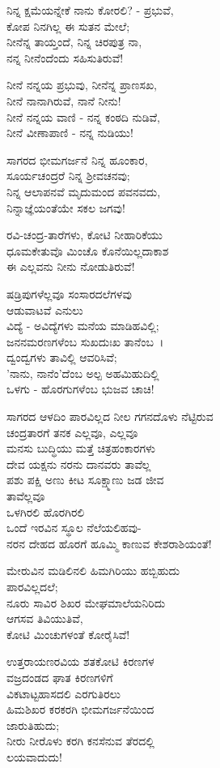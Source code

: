 ನಿನ್ನ ಕ್ಷಮೆಯನ್ನೇಕೆ ನಾನು ಕೋರಲಿ? - ಪ್ರಭುವೆ,\\ಕೋಪ ನಿನಗಿಲ್ಲ ಈ ಸುತನ ಮೇಲೆ;\\ನೀನೆನ್ನ ತಾಯ್ತಂದೆ, ನಿನ್ನ ಚಿರಪುತ್ರ ನಾ,\\ನನ್ನ ನೀನೆಂದೆಂದು ಸಹಿಸುತಿರುವೆ!

ನೀನೆ ನನ್ನಯ ಪ್ರಭುವು, ನೀನೆನ್ನ ಪ್ರಾಣಸಖ,\\ನೀನೆ ನಾನಾಗಿರುವೆ, ನಾನೆ ನೀನು!\\ನೀನೆ ನನ್ನಯ ವಾಣಿ - ನನ್ನ ಕಂಠದಿ ನುಡಿವೆ,\\ನೀನೆ ವೀಣಾಪಾಣಿ - ನನ್ನ ನುಡಿಯು!

ಸಾಗರದ ಭೀಮಗರ್ಜನೆ ನಿನ್ನ ಹೂಂಕಾರ,\\ಸೂರ್ಯಚಂದ್ರರೆ ನಿನ್ನ ಶ‍್ರೀವಚನವು;\\ನಿನ್ನ ಆಲಾಪನವೆ ಮೃದುಮಂದ ಪವನವದು,\\ನಿನ್ನಾಜ್ಞೆಯಂತೆಯೇ ಸಕಲ ಜಗವು!

ರವಿ-ಚಂದ್ರ-ತಾರೆಗಳು, ಕೋಟಿ ನೀಹಾರಿಕೆಯು\\ಧೂಮಕೇತುವೊ ಮಿಂಚೊ ಕೊನೆಯಿಲ್ಲದಾಕಾಶ\\ಈ ಎಲ್ಲವನು ನೀನು ನೋಡುತಿರುವೆ!

ಷಡ್ರಿಪುಗಳೆಲ್ಲವೂ ಸಂಸಾರದಲೆಗಳವು\\ಆಡುವಾಟವೆ ಎನುಲು\\ವಿದ್ಯೆ - ಅವಿದ್ಯೆಗಳು ಮನೆಯ ಮಾಡಿಹವಿಲ್ಲಿ;\\ಜನನಮರಣಗಳೆಂಬ ಸುಖದುಃಖ ತಾನೆಂಬ~।\\
 ದ್ವಂದ್ವಗಳು ತಾವಿಲ್ಲಿ ಆವರಿಸಿವೆ;\\'ನಾನು, ನಾನೆಂ'ದೆಂಬ ಅಲ್ಪ ಅಹಮಿಹುದಿಲ್ಲಿ\\ಒಳಗು - ಹೊರಗುಗಳೆಂಬ ಭುಜವ ಚಾಚಿ!

ಸಾಗರದ ಆಳದಿಂ ಪಾರವಿಲ್ಲದ ನೀಲ ಗಗನದೊಳು ನೆಟ್ಟಿರುವ\\ಚಂದ್ರತಾರಗೆ ತನಕ ಎಲ್ಲವೂ, ಎಲ್ಲವೂ\\ಮನಸು ಬುದ್ಧಿಯು ಮತ್ತೆ ಚಿತ್ರಹಂಕಾರಗಳು\\ದೇವ ಯಕ್ಷನು ನರನು ದಾನವರು ತಾವೆಲ್ಲ\\ಪಶು ಪಕ್ಷಿ ಅಣು ಕೀಟ ಸೂಕ್ಷ್ಮಾಣು ಜಡ ಜೀವ\\ತಾವೆಲ್ಲವೂ\\ಒಳಗಿರಲಿ ಹೊರಗಿರಲಿ\\ಒಂದೆ ಇರವಿನ ಸ್ಥೂಲ ನೆಲೆಯಲಿಹವು-\\ನರನ ದೇಹದ ಹೊರಗೆ ಹೂಮ್ಮಿ ಕಾಣುವ ಕೇಶರಾಶಿಯಂತೆ!

ಮೇರುವಿನ ಮಡಿಲಿನಲಿ ಹಿಮಗಿರಿಯು ಹಬ್ಬಿಹುದು\\ಪಾರವಿಲ್ಲದಲೆ;\\ನೂರು ಸಾವಿರ ಶಿಖರ ಮೇಘಮಾಲೆಯನಿರಿದು\\ಆಗಸವ ತಿವಿಯುತಿವೆ,\\ಕೋಟಿ ಮಿಂಚುಗಳಂತೆ ಕೋರೈಸಿವೆ!

ಉತ್ತರಾಯಣರವಿಯ ಶತಕೋಟಿ ಕಿರಣಗಳ\\ವಜ್ರದಂಡದ ಘಾತ ಕಿರಣಗಳಿಗೆ\\ವಿಕಟಾಟ್ಟಹಾಸದಲಿ ಎರಗುತಿರಲು\\ಹಿಮಶಿಖರ ಕರಕರಗಿ ಭೀಮಗರ್ಜನೆಯಿಂದ\\ಜಾರುತಿಹುದು;\\ನೀರು ನೀರೊಳು ಕರಗಿ ಕನಸೆನುವ ತೆರದಲ್ಲಿ\\ಲಯವಾದುದು!

